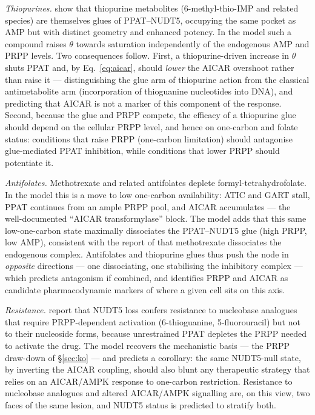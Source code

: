 \documentclass[a4paper,fleqn]{cas-sc}
\begin{document}
\emph{Thiopurines.} \citet{witus2026} show that thiopurine metabolites
(6-methyl-thio-IMP and related species) are themselves glues of PPAT--NUDT5,
occupying the same pocket as AMP but with distinct geometry and enhanced potency.
In the model such a compound raises $\theta$ towards saturation independently of
the endogenous AMP and PRPP levels. Two consequences follow. First, a
thiopurine-driven increase in $\theta$ shuts PPAT and, by Eq.~\eqref{eq:aicar},
should \emph{lower} the AICAR overshoot rather than raise it --- distinguishing the
glue arm of thiopurine action from the classical antimetabolite arm (incorporation
of thioguanine nucleotides into DNA), and predicting that AICAR is not a marker of
this component of the response. Second, because the glue and PRPP compete, the
efficacy of a thiopurine glue should depend on the cellular PRPP level, and hence
on one-carbon and folate status: conditions that raise PRPP (one-carbon
limitation) should antagonise glue-mediated PPAT inhibition, while conditions that
lower PRPP should potentiate it.

\emph{Antifolates.} Methotrexate and related antifolates deplete
formyl-tetrahydrofolate. In the model this is a move to low one-carbon
availability: ATIC and GART stall, PPAT continues from an ample PRPP pool, and
AICAR accumulates --- the well-documented ``AICAR transformylase'' block. The model
adds that this same low-one-carbon state maximally dissociates the PPAT--NUDT5
glue (high PRPP, low AMP), consistent with the report of \citet{witus2026} that
methotrexate dissociates the endogenous complex. Antifolates and thiopurine glues
thus push the node in \emph{opposite} directions --- one dissociating, one
stabilising the inhibitory complex --- which predicts antagonism if combined, and
identifies PRPP and AICAR as candidate pharmacodynamic markers of where a given
cell sits on this axis.

\emph{Resistance.} \citet{strefeler2025} report that NUDT5 loss confers resistance
to nucleobase analogues that require PRPP-dependent activation (6-thioguanine,
5-fluorouracil) but not to their nucleoside forms, because unrestrained PPAT
depletes the PRPP needed to activate the drug. The model recovers the mechanistic
basis --- the PRPP draw-down of \S\ref{sec:ko} --- and predicts a corollary: the
same NUDT5-null state, by inverting the AICAR coupling, should also blunt any
therapeutic strategy that relies on an AICAR/AMPK response to one-carbon
restriction. Resistance to nucleobase analogues and altered AICAR/AMPK signalling
are, on this view, two faces of the same lesion, and NUDT5 status is predicted to
stratify both.
\end{document}
